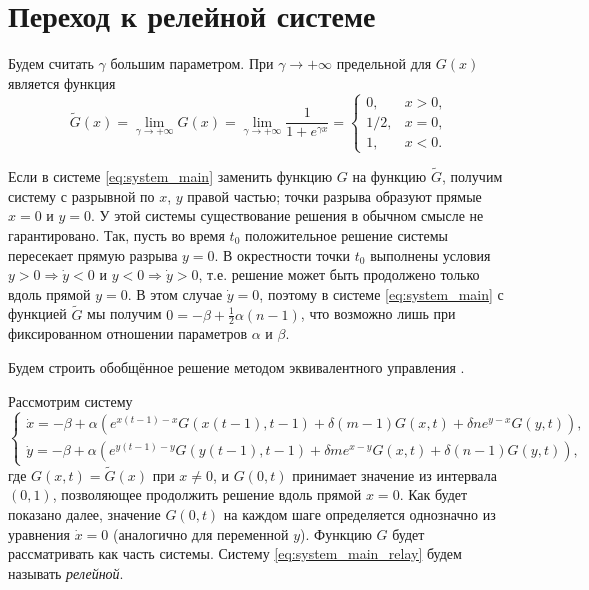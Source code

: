 \section{Переход к релейной системе}\label{sec:ch3/sect3}

Будем считать $\gamma$ большим параметром. При $\gamma \to +\infty$ предельной для $G(x)$ является функция 
%
\begin{equation}
	\label{eq:relay_G_tilde}
	\tilde{G}(x) = \lim\limits_{\gamma \to +\infty}G(x) = \lim\limits_{\gamma \to +\infty} \dfrac{1}{1 + e^{\gamma x}} = 
	\begin{cases}
		0, & x > 0,\\
		1/2, & x = 0,\\
		1, & x < 0.
	\end{cases}
\end{equation}

Если в системе \eqref{eq:system_main} заменить функцию $G$ на функцию $\tilde{G}$, получим систему с разрывной по $x$, $y$ правой частью; точки разрыва образуют прямые $x = 0$ и $y = 0$. У этой системы существование решения в обычном смысле не гарантировано. Так, пусть во время $t_0$ положительное решение системы пересекает прямую разрыва $y = 0$. В окрестности точки $t_0$ выполнены условия $y > 0 \Rightarrow \dot{y} < 0$ и $y < 0 \Rightarrow \dot{y} > 0$, т.е. решение может быть продолжено только вдоль прямой $y = 0$. В этом случае $\dot{y} = 0$, поэтому в системе \eqref{eq:system_main} с функцией $\tilde{G}$ мы получим $0 = -\beta + \frac{1}{2} \alpha (n - 1)$, что возможно лишь при фиксированном отношении параметров $\alpha$ и $\beta$.

Будем строить обобщённое решение методом эквивалентного управления \cite[\S 4, с. 54]{Filippov1988}.

Рассмотрим систему
%
\small
\begin{equation}
	\label{eq:system_main_relay}
	\begin{cases}
		\dot{x} = -\beta + \alpha \left(e^{x(t - 1) - x} G(x(t - 1), t - 1) + \delta (m - 1) G(x, t) + \delta n e^{y - x} G(y, t)\right),\\
		\dot{y} = -\beta + \alpha \left(e^{y(t - 1) - y} G(y(t - 1), t - 1) + \delta m e^{x - y} G(x, t) + \delta (n - 1) G(y, t)\right),
	\end{cases}
\end{equation}
\normalsize
%
где $G(x, t) = \tilde{G}(x)$ при $x \neq 0$, и $G(0, t)$ принимает значение из интервала $(0, 1)$, позволяющее продолжить решение вдоль прямой $x = 0$. Как будет показано далее, значение $G(0, t)$ на каждом шаге определяется однозначно из уравнения $\dot{x} = 0$ (аналогично для переменной $y$). Функцию $G$ будет рассматривать как часть системы.
%
Систему \eqref{eq:system_main_relay} будем называть \emph{релейной}.

